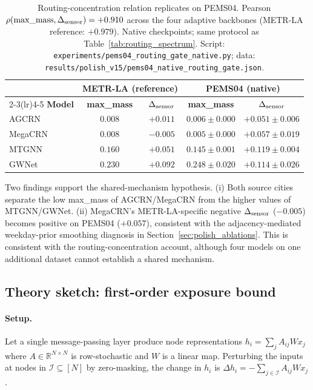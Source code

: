 \begin{table}[h]
\centering
\caption{Routing-concentration relation replicates on PEMS04. Pearson
$\rho(\text{max\_mass}, \Delta_{\text{sensor}}) = {+}0.910$ across the four adaptive
backbones (METR-LA reference: ${+}0.979$). Native checkpoints; same protocol
as Table~\ref{tab:routing_spectrum}. Script:
\texttt{experiments/pems04\_routing\_gate\_native.py};
data: \texttt{results/polish\_v15/pems04\_native\_routing\_gate.json}.}
\label{tab:pems04_routing}
\vskip 0.05in
\small
\begin{tabular}{lcccc}
\toprule
& \multicolumn{2}{c}{\textbf{METR-LA (reference)}} & \multicolumn{2}{c}{\textbf{PEMS04 (native)}} \\
\cmidrule(lr){2-3}\cmidrule(lr){4-5}
\textbf{Model} & \textbf{max\_mass} & \textbf{$\Delta_{\text{sensor}}$} & \textbf{max\_mass} & \textbf{$\Delta_{\text{sensor}}$} \\
\midrule
AGCRN     & $0.008$ & $+0.011$ & $0.006 \pm 0.000$ & $+0.051 \pm 0.006$ \\
MegaCRN   & $0.008$ & $-0.005$ & $0.005 \pm 0.000$ & $+0.057 \pm 0.019$ \\
MTGNN     & $0.160$ & $+0.051$ & $0.145 \pm 0.001$ & $+0.119 \pm 0.004$ \\
GWNet     & $0.230$ & $+0.092$ & $0.248 \pm 0.020$ & $+0.114 \pm 0.026$ \\
\bottomrule
\end{tabular}
\end{table}

Two findings support the shared-mechanism hypothesis. (i) Both source cities
separate the low max\_mass of AGCRN/MegaCRN from the higher values of
MTGNN/GWNet. (ii) MegaCRN's METR-LA-specific negative $\Delta_{\text{sensor}}$
($-0.005$) becomes positive on PEMS04 ($+0.057$), consistent with the
adjacency-mediated weekday-prior smoothing diagnosis in
Section~\ref{sec:polish_ablations}. This is consistent with the routing-concentration
account, although four models on one additional dataset cannot establish a
shared mechanism.

\subsection{Theory sketch: first-order exposure bound}
\label{sec:appendix_theory}

\paragraph{Setup.}
Let a single message-passing layer produce node representations
$h_i = \sum_j A_{ij} W x_j$ where $A \in \mathbb{R}^{N\times N}$ is
row-stochastic and $W$ is a linear map. Perturbing the inputs at nodes in
$\mathcal{I} \subseteq [N]$ by zero-masking, the change in $h_i$ is
$\Delta h_i = -\sum_{j \in \mathcal{I}} A_{ij} W x_j$.


